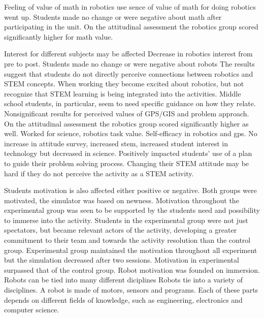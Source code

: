 \bigskip\noindent
Feeling of value of math in robotics use
\cite{silk2011resources} sence of value of math for doing robotics went up. 
\cite{silk2011resources}Students made no change or were negative about math after participating in the unit. 
\cite{nugent2009use} On the attitudinal assessment the robotics group scored significantly higher for math value.

\bigskip\noindent
Interest for different subjects may be affected
\cite{silk2011resources} Decrease in robotics interest from pre to post. 
\cite{silk2011resources} Students made no change or were negative about robots
\cite{nugent2008effect} The results suggest that students do not directly perceive connections between robotics and STEM concepts. When working they become excited about robotics, but not recognize that STEM learning is being integrated into the activities. Middle school students, in particular, seem to need specific guidance on how they relate. 
\cite{nugent2009use} Nonsignificant results for perceived values of GPS/GIS and problem approach.
\cite{nugent2009use}On the attitudinal assessment the robotics group scored significantly higher as well. Worked for science, robotics task value. Self-efficacy in robotics and gps. 
\cite{nugent2008effect} No increase in attitude survey, increased stem, increased student interest in technology but decreased in science. Positively impacted students' use of a plan to guide their problem solving process. Changing their STEM attitude may be hard if they do not perceive the activity as a STEM activity.

\bigskip\noindent
Students motivation is also affected either positive or negative.
\cite{mitnik2009collaborative} Both groups were motivated, the simulator was based on newness. Motivation throughout the experimental group was seen to be supported by the students need and possibility to immerse into the activity. Students in the experimental group were not just spectators, but became relevant actors of the activity, developing a greater commitment to their team and towards the activity resolution than the control group. Experimental group maintained the motivation throughout all experiment but the simulation decreased after two sessions. 
\cite{mitnik2009collaborative}Motivation in experimental surpassed that of the control group. Robot motivation was founded on immersion.
Robots can be tied into many different diciplines
\cite{barker2007robotics} Robots tie into a variety of disciplines. A robot is made of motors, sensors and programs. Each of these parts depends on different fields of knowledge, such as engineering, electronics and computer science. 

